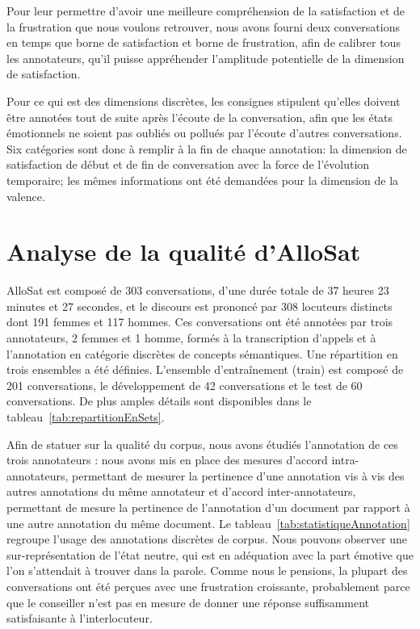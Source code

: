 Pour leur permettre d'avoir une meilleure compréhension de la satisfaction et de la frustration que nous voulons retrouver, nous avons fourni deux conversations en temps que borne de satisfaction et borne de frustration, afin de calibrer tous les annotateurs, qu'il puisse appréhender l'amplitude potentielle de la dimension de satisfaction.

Pour ce qui est des dimensions discrètes, les consignes stipulent qu'elles doivent être annotées tout de suite après l'écoute de la conversation, afin que les états émotionnels ne soient pas oubliés ou pollués par l'écoute d'autres conversations.
Six catégories sont donc à remplir à la fin de chaque annotation: la dimension de satisfaction de début et de fin de conversation avec la force de l'évolution temporaire; les mêmes informations ont été demandées pour la dimension de la valence.

\section{Analyse de la qualité d'AlloSat}
AlloSat est composé de 303 conversations, d'une durée totale de 37 heures 23 minutes et 27 secondes, et le discours est prononcé par 308 locuteurs distincts dont 191 femmes et 117 hommes.
Ces conversations ont été annotées par trois annotateurs, 2 femmes et 1 homme, formés à la transcription d'appels et à l'annotation en catégorie discrètes de concepts sémantiques.
Une répartition en trois ensembles a été définies. L'ensemble d’entraînement (train) est composé de 201 conversations, le développement de 42 conversations et le test de 60 conversations. De plus amples détails sont disponibles dans le tableau~\ref{tab:repartitionEnSets}.


Afin de statuer sur la qualité du corpus, nous avons étudiés l'annotation de ces trois annotateurs : nous avons mis en place des mesures d'accord intra-annotateurs, permettant de mesurer la pertinence d'une annotation vis à vis des autres annotations du même annotateur et d'accord inter-annotateurs, permettant de mesure la pertinence de l'annotation d'un document par rapport à une autre annotation du même document.
Le tableau~\ref{tab:statistiqueAnnotation} regroupe l'usage des annotations discrètes de corpus. Nous pouvons observer une sur-représentation de l'état neutre, qui est en adéquation avec la part émotive que l'on s'attendait à trouver dans la parole. Comme nous le pensions, la plupart des conversations ont été perçues avec une frustration croissante, probablement parce que le conseiller n’est pas en mesure de donner une réponse suffisamment satisfaisante à l’interlocuteur.

